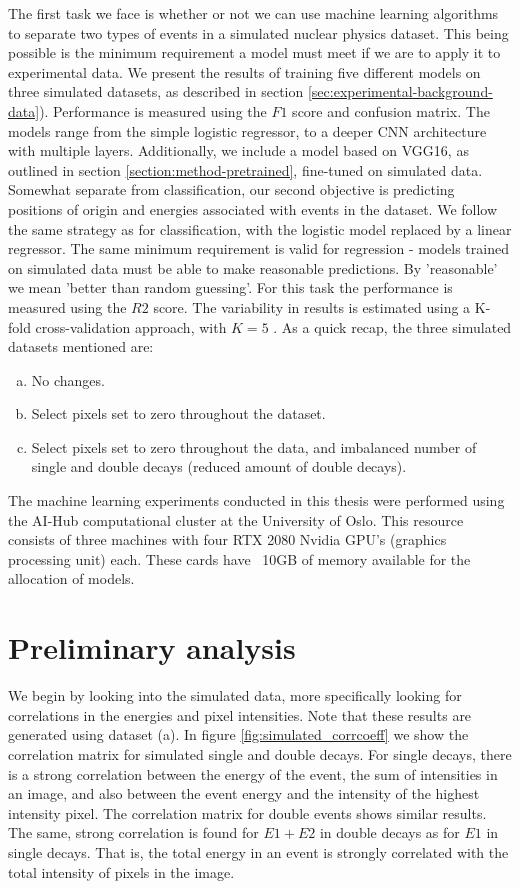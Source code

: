 \noindent The first task we face is whether or not we can use machine learning algorithms to 
separate two types of events in a simulated nuclear physics dataset. This being possible
is the minimum requirement a model must meet if we are to apply it to experimental data.
We present the results of training five different models on three simulated 
datasets, as described in section \ref{sec:experimental-background-data}).
Performance is measured using the $F1$ score and confusion matrix. The models range from
the simple logistic regressor, to a deeper CNN architecture with multiple layers. Additionally,
we include a model based on VGG16, as outlined in section \ref{section:method-pretrained},
fine-tuned on simulated data. Somewhat separate from classification, our second objective
is predicting positions of origin and energies associated with events in the dataset.
We follow the same strategy as for classification, with the logistic model replaced by a linear
regressor. The same minimum requirement is valid for regression - models trained on simulated data
must be able to make reasonable predictions. By 'reasonable' we mean 'better than random guessing'.
For this task the performance is measured using the $R2$ score. The variability in results is 
estimated using a K-fold cross-validation approach, with $K = 5$ \cite{Stone1974}.
As a quick recap, the three simulated datasets mentioned are:
\begin{enumerate}[a)]
    \item No changes.
    \item Select pixels set to zero throughout the dataset.
    \item Select pixels set to zero throughout the data, and imbalanced number of single
    and double decays (reduced amount of double decays).
\end{enumerate}

\noindent The machine learning experiments conducted in this thesis were performed
using the AI-Hub computational cluster at the University of Oslo. This resource 
consists of three machines with four RTX 2080 Nvidia GPU’s (graphics
processing unit) each. These cards have ~10GB of memory available for the
allocation of models.

\section{Preliminary analysis}
We begin by looking into the simulated data, more specifically looking for correlations
in the energies and pixel intensities. Note that these results are generated using
dataset (a). In figure \ref{fig:simulated_corrcoeff} we show
the correlation matrix for simulated single and double decays. For single decays, there
is a strong correlation between the energy of the event, the sum of intensities in an image,
and also between the event energy and the intensity of the highest intensity pixel.
The correlation matrix for double events shows similar results. The same, strong correlation
is found for $E1 + E2$ in double decays as for $E1$ in single decays. That is, the total energy
in an event is strongly correlated with the total intensity of pixels in the image.


